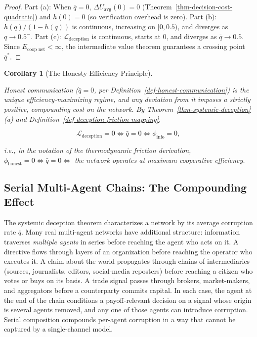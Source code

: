 \documentclass[11pt]{article}
\theoremstyle{plain}
\newtheorem{corollary}[theorem]{Corollary}
\theoremstyle{definition}
\theoremstyle{remark}
\let\origsubsection\subsection
\renewcommand{\subsection}{\needspace{7\baselineskip}\origsubsection}
\begin{document}
\begin{proof}
Part (a): When $\bar{q} = 0$, $\Delta U_{\text{avg}}(0) = 0$ (Theorem~\ref{thm-decision-cost-quadratic}) and $h(0) = 0$ (so verification overhead is zero). Part (b): $h(q)/(1 - h(q))$ is continuous, increasing on $[0, 0.5)$, and diverges as $q \to 0.5^-$. Part (c): $\mathcal{L}_{\text{deception}}$ is continuous, starts at 0, and diverges as $\bar{q} \to 0.5$. Since $E_{\text{coop net}} < \infty$, the intermediate value theorem guarantees a crossing point $\bar{q}^*$.
\end{proof}

\begin{corollary}[The Honesty Efficiency Principle]
\label{cor-honesty-efficiency}

Honest communication ($\bar{q} = 0$, per Definition~\ref{def-honest-communication}) is the unique efficiency-maximizing regime, and any deviation from it imposes a strictly positive, compounding cost on the network. By Theorem~\ref{thm-systemic-deception}(a) and Definition~\ref{def-deception-friction-mapping},

$$\mathcal{L}_{\text{deception}} = 0 \iff \bar{q} = 0 \iff \phi_{\text{info}} = 0,$$

i.e., in the notation of the thermodynamic friction derivation, $\phi_{\text{honest}} = 0 \iff \bar{q} = 0 \iff$ the network operates at maximum cooperative efficiency.
\end{corollary}

\subsection{Serial Multi-Agent Chains: The Compounding
Effect}\label{serial-multi-agent-chains-the-compounding-effect}

The systemic deception theorem characterizes a network by its average
corruption rate \(\bar{q}\). Many real multi-agent networks have
additional structure: information traverses \emph{multiple agents} in
series before reaching the agent who acts on it. A directive flows
through layers of an organization before reaching the operator who
executes it. A claim about the world propagates through chains of
intermediaries (sources, journalists, editors, social-media reposters)
before reaching a citizen who votes or buys on its basis. A trade signal
passes through brokers, market-makers, and aggregators before a
counterparty commits capital. In each case, the agent at the end of the
chain conditions a payoff-relevant decision on a signal whose origin is
several agents removed, and any one of those agents can introduce
corruption. Serial composition compounds per-agent corruption in a way
that cannot be captured by a single-channel model.
\end{document}
